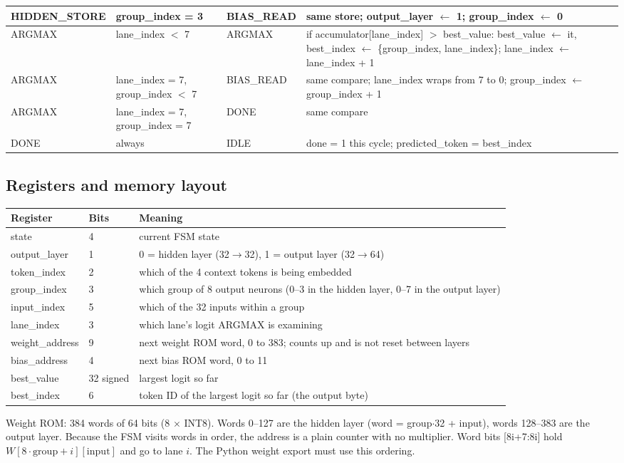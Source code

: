 \documentclass[10pt,a4paper]{article}
\begin{document}
\begin{longtable}{@{}>{\ttfamily}p{2.3cm} >{\ttfamily}p{2.9cm} >{\ttfamily}p{2.3cm} p{8.3cm}@{}}
HIDDEN_STORE & group_index = 3 & BIAS_READ & same store; output_layer $\leftarrow$ 1; group_index $\leftarrow$ 0 \\
\midrule
ARGMAX & lane_index $<$ 7 & ARGMAX & if accumulator[lane_index] $>$ best_value: best_value $\leftarrow$ it, best_index $\leftarrow$ \{group_index, lane_index\}; lane_index $\leftarrow$ lane_index + 1 \\
ARGMAX & lane_index = 7, group_index $<$ 7 & BIAS_READ & same compare; lane_index wraps from 7 to 0; group_index $\leftarrow$ group_index + 1 \\
ARGMAX & lane_index = 7, group_index = 7 & DONE & same compare \\
\midrule
DONE & always & IDLE & done = 1 this cycle; predicted_token = best_index \\
\bottomrule
\end{longtable}
\normalsize

\subsection*{Registers and memory layout}

\footnotesize
\begin{tabular}{@{}>{\ttfamily}l l p{11cm}@{}}
\toprule
\textbf{Register} & \textbf{Bits} & \textbf{Meaning} \\
\midrule
state & 4 & current FSM state \\
output_layer & 1 & 0 = hidden layer (32$\to$32), 1 = output layer (32$\to$64) \\
token_index & 2 & which of the 4 context tokens is being embedded \\
group_index & 3 & which group of 8 output neurons (0--3 in the hidden layer, 0--7 in the output layer) \\
input_index & 5 & which of the 32 inputs within a group \\
lane_index & 3 & which lane's logit ARGMAX is examining \\
weight_address & 9 & next weight ROM word, 0 to 383; counts up and is not reset between layers \\
bias_address & 4 & next bias ROM word, 0 to 11 \\
best_value & 32 signed & largest logit so far \\
best_index & 6 & token ID of the largest logit so far (the output byte) \\
\bottomrule
\end{tabular}

\medskip
Weight ROM: 384 words of 64 bits (8 $\times$ INT8). Words 0--127 are the hidden layer (word = group$\cdot$32 + input), words 128--383 are the output layer. Because the FSM visits words in order, the address is a plain counter with no multiplier.
Word bits [8i+7:8i] hold $W[8\cdot\mathrm{group}+i][\mathrm{input}]$ and go to lane $i$. The Python weight export must use this ordering.
\end{document}
